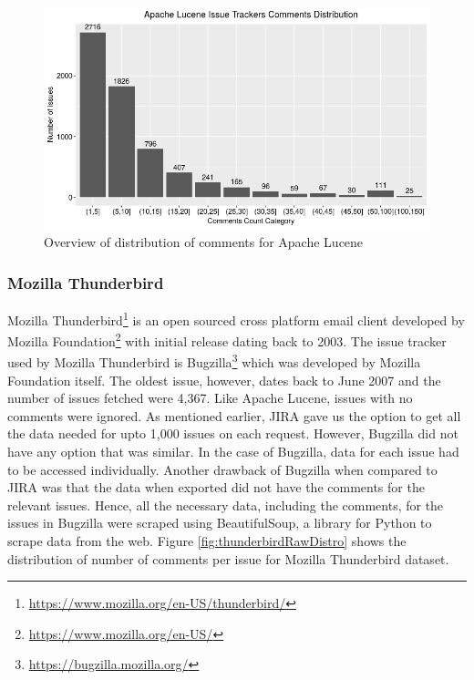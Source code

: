 \documentclass[a4paper,12pt,twoside]{report}
\begin{document}
\begin{figure}[h] %
    \centering
    \includegraphics[width=12cm]{lucene-comment-distribution-raw}
    \caption{Overview of distribution of comments for Apache Lucene}
    \label{fig:luceneRawDistro}
\end{figure}

\subsubsection{Mozilla Thunderbird}
Mozilla Thunderbird\footnote{\url{https://www.mozilla.org/en-US/thunderbird/}} is an open sourced cross platform email client developed by Mozilla Foundation\footnote{\url{https://www.mozilla.org/en-US/}} with initial release dating back to 2003. The issue tracker used by Mozilla Thunderbird is Bugzilla\footnote{\url{https://bugzilla.mozilla.org/}} which was developed by Mozilla Foundation itself. The oldest issue, however, dates back to June 2007 and the number of issues fetched were 4,367. Like Apache Lucene, issues with no comments were ignored. 
\newline \newline
As mentioned earlier, JIRA gave us the option to get all the data needed for upto 1,000 issues on each request. However, Bugzilla did not have any option that was similar. In the case of Bugzilla, data for each issue had to be accessed individually. Another drawback of Bugzilla when compared to JIRA was that the data when exported did not have the comments for the relevant issues. Hence, all the necessary data, including the comments, for the issues in Bugzilla were scraped using BeautifulSoup, a library for Python to scrape data from the web. Figure \ref{fig:thunderbirdRawDistro} shows the distribution of number of comments per issue for Mozilla Thunderbird dataset. 
\end{document}
